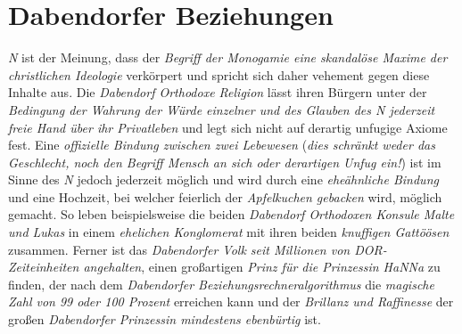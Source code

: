 \section{{Dabendorfer Beziehungen}}
\textit{N} ist der Meinung, dass der \textit{Begriff der Monogamie eine skandalöse Maxime der christlichen Ideologie} verkörpert und spricht sich daher vehement gegen diese Inhalte aus. Die \textit{Dabendorf Orthodoxe Religion} lässt ihren Bürgern unter der \textit{Bedingung der Wahrung der Würde einzelner und des Glauben des \textit{N} jederzeit freie Hand über ihr Privatleben} und legt sich nicht auf derartig unfugige Axiome fest. Eine \textit{offizielle Bindung zwischen zwei Lebewesen} (\textit{dies schränkt weder das Geschlecht, noch den Begriff Mensch an sich oder derartigen Unfug ein!}) ist im Sinne des \textit{N} jedoch jederzeit möglich und wird durch eine \textit{eheähnliche Bindung} und eine Hochzeit, bei welcher feierlich der \textit{Apfelkuchen gebacken} wird, möglich gemacht. So leben beispielsweise die beiden \textit{Dabendorf Orthodoxen Konsule Malte und Lukas} in einem \textit{ehelichen Konglomerat} mit ihren beiden \textit{knuffigen Gattöösen} zusammen. Ferner ist das \textit{Dabendorfer Volk seit Millionen von DOR-Zeiteinheiten angehalten}, einen großartigen \textit{Prinz für die Prinzessin HaNNa} zu finden, der nach dem \textit{Dabendorfer Beziehungsrechneralgorithmus} die \textit{magische Zahl von 99 oder 100 Prozent} erreichen kann und der \textit{Brillanz und Raffinesse} der großen \textit{Dabendorfer Prinzessin mindestens ebenbürtig} ist.

